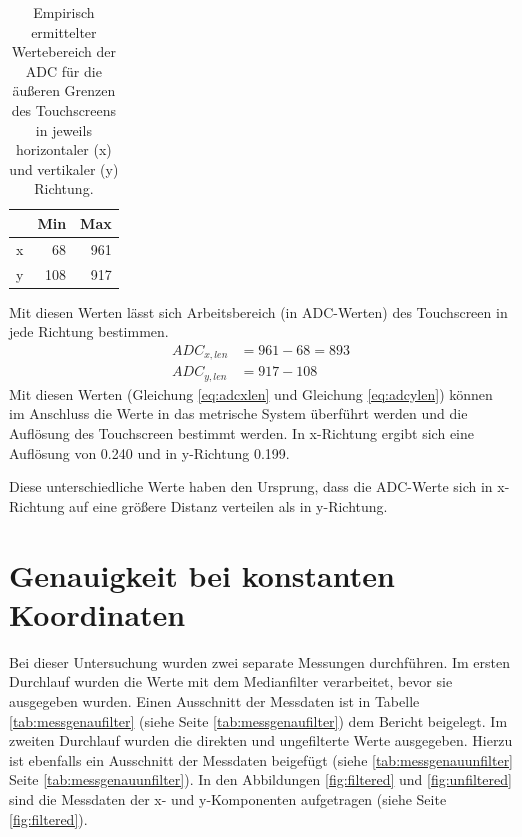 \begin{table}[h]
    \centering
    \caption[Empirisch ermittelter Wertebereich der ADC]{Empirisch ermittelter Wertebereich der ADC für die äußeren Grenzen des Touchscreens in jeweils horizontaler (x) und vertikaler (y) Richtung.}
    \begin{tabular}{@{}lrr@{}}
        \toprule
            &Min    &Max\\
        \midrule
        x   &68     &961\\
        y   &108    &917\\
        \bottomrule
    \end{tabular}
    \label{tab:ADC min max}
\end{table}

Mit diesen Werten lässt sich Arbeitsbereich (in ADC-Werten) des Touchscreen in jede Richtung bestimmen.
\begin{align}
    ADC_{x,len} &= 961 - 68 = 893
    \label{eq:adcxlen}\\
    ADC_{y,len} &= 917 - 108
    \label{eq:adcylen}
\end{align}
Mit diesen Werten (Gleichung \cref{eq:adcxlen} und Gleichung \cref{eq:adcylen}) können im Anschluss die Werte in das metrische System überführt werden und die Auflösung des Touchscreen bestimmt werden.
In x-Richtung ergibt sich eine Auflösung von \SI{0,240}{} und in y-Richtung \SI{0,199}{}.

Diese unterschiedliche Werte haben den Ursprung, dass die ADC-Werte sich in x-Richtung auf eine größere Distanz verteilen als in y-Richtung.

\section{Genauigkeit bei konstanten Koordinaten}
\label{ab:genau}
Bei dieser Untersuchung wurden zwei separate Messungen durchführen.
Im ersten Durchlauf wurden die Werte mit dem Medianfilter verarbeitet, bevor sie ausgegeben wurden.
Einen Ausschnitt der Messdaten ist in Tabelle \cref{tab:messgenaufilter} (siehe Seite \cref{tab:messgenaufilter}) dem Bericht beigelegt.
Im zweiten Durchlauf wurden die direkten und ungefilterte Werte ausgegeben.
Hierzu ist ebenfalls ein Ausschnitt der Messdaten beigefügt (siehe \cref{tab:messgenauunfilter} Seite \cref{tab:messgenauunfilter}).
In den Abbildungen \cref{fig:filtered} und \cref{fig:unfiltered} sind die Messdaten der x- und y-Komponenten aufgetragen (siehe Seite \cref{fig:filtered}).

